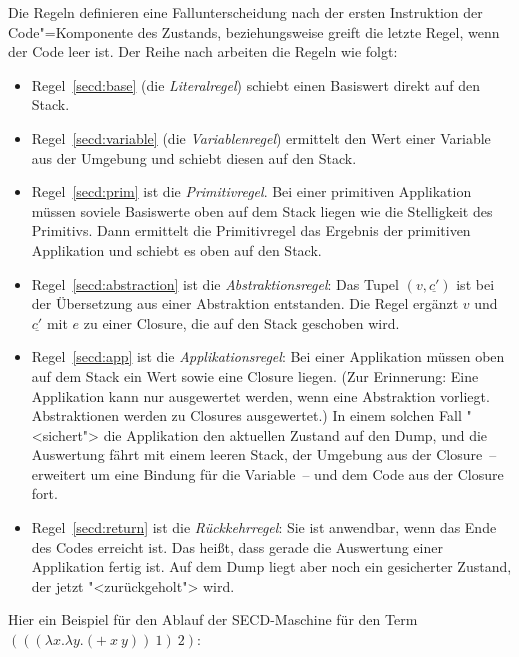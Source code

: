 Die Regeln definieren eine Fallunterscheidung nach der ersten
Instruktion der Code"=Komponente des Zustands, beziehungsweise greift die letzte
Regel, wenn der Code leer ist.  Der Reihe nach arbeiten die Regeln wie
folgt:
%
\begin{itemize}
\item Regel~\ref{secd:base} (die
  \textit{Literalregel}) schiebt einen Basiswert
  direkt auf den Stack.
\item Regel~\ref{secd:variable} (die
  \textit{Variablenregel}) ermittelt den Wert
  einer Variable aus der Umgebung und schiebt diesen auf den Stack.
\item Regel~\ref{secd:prim} ist die
  \textit{Primitivregel}.  Bei einer primitiven
  Applikation müssen soviele Basiswerte oben auf dem Stack liegen wie
  die Stelligkeit des Primitivs.  Dann ermittelt die Primitivregel das Ergebnis der
  primitiven Applikation und schiebt es oben auf den Stack.
\item Regel~\ref{secd:abstraction} ist die
  \textit{Abstraktionsregel}: Das Tupel
  $(v,\underline{c'})$ ist bei der Übersetzung aus einer Abstraktion
  entstanden.  Die Regel ergänzt $v$ und $\underline{c'}$ mit
  $e$ zu einer Closure, die auf den Stack geschoben wird.
\item Regel~\ref{secd:app} ist die
  \textit{Applikationsregel}: Bei einer
  Applikation müssen oben auf dem Stack ein Wert sowie eine Closure
  liegen.  (Zur Erinnerung: Eine Applikation kann nur ausgewertet
  werden, wenn eine Abstraktion vorliegt.  Abstraktionen werden zu
  Closures ausgewertet.)  In einem solchen Fall "<sichert"> die
  Applikation den aktuellen Zustand auf den Dump, und die Auswertung fährt mit
  einem leeren Stack, der Umgebung aus der Closure~-- erweitert um
  eine Bindung für die Variable~-- und dem Code aus der Closure fort.
\item Regel~\ref{secd:return} ist die
  \textit{Rückkehrregel}: Sie ist anwendbar,
  wenn das Ende des Codes erreicht ist.  Das heißt, dass gerade
  die Auswertung einer Applikation fertig ist.  Auf dem Dump liegt
  aber noch ein gesicherter Zustand, der jetzt "<zurückgeholt"> wird.
\end{itemize}
%
Hier ein Beispiel für den Ablauf der SECD-Maschine für den Term
$(((\lambda x.\lambda y.(+~x~y))~1)~2)$:
%

